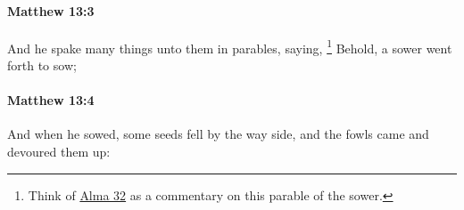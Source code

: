 		\paragraph{Matthew 13:3} %
			\label{MATTHEW-13-3}

			And he spake many things unto them in parables, saying,
				\footnote{%
					Think of \hyperref[ALMA-32]{Alma 32} as a commentary on this parable of the sower.
					}%
			Behold, a sower went forth to sow;

			\begin{framed}
			\scriptsize
				\begin{compactdesc}
					\item[SBLG] 
				\end{compactdesc}
			\end{framed}

		\paragraph{Matthew 13:4} %
			\label{MATTHEW-13-4}

			And when he sowed, some seeds fell by the way side, and the fowls came and devoured them up:

